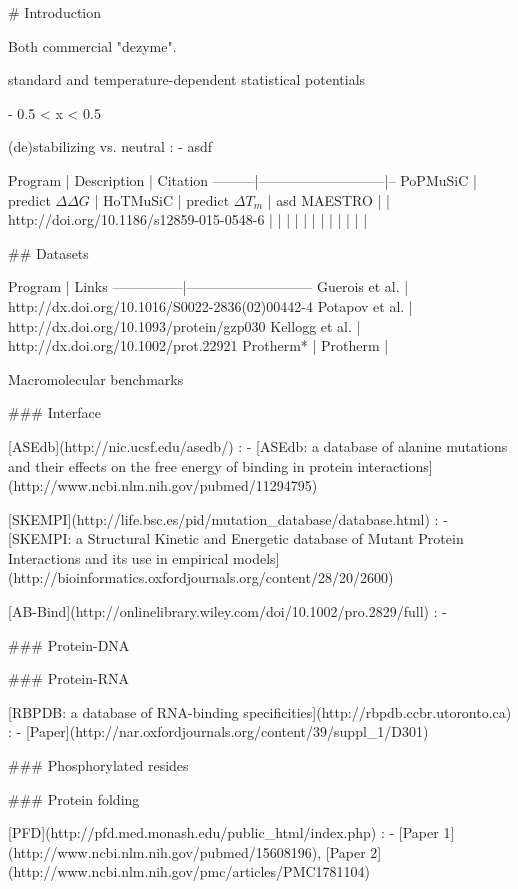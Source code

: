 
# Introduction


Both commercial "dezyme".

standard and temperature-dependent statistical potentials

- 0.5 < x < 0.5


(de)stabilizing vs. neutral
: - asdf



Program  | Description               |  Citation
---------|---------------------------|--
PoPMuSiC | predict $\Delta \Delta G$ |
HoTMuSiC | predict $\Delta T_{m}$    | asd
MAESTRO  |   | http://doi.org/10.1186/s12859-015-0548-6
  |   |
  |   |
  |   |
  |   |
  |   |
  |   |



## Datasets

Program        | Links
---------------|---------------------------
Guerois et al. | http://dx.doi.org/10.1016/S0022-2836(02)00442-4
Potapov et al. | http://dx.doi.org/10.1093/protein/gzp030
Kellogg et al. | http://dx.doi.org/10.1002/prot.22921
Protherm*      |
Protherm       |

Macromolecular benchmarks


### Interface

[ASEdb](http://nic.ucsf.edu/asedb/)
: - [ASEdb: a database of alanine mutations and their effects on the free energy of binding in protein interactions](http://www.ncbi.nlm.nih.gov/pubmed/11294795)

[SKEMPI](http://life.bsc.es/pid/mutation_database/database.html)
: - [SKEMPI: a Structural Kinetic and Energetic database of Mutant Protein Interactions and its use in empirical models](http://bioinformatics.oxfordjournals.org/content/28/20/2600)

[AB-Bind](http://onlinelibrary.wiley.com/doi/10.1002/pro.2829/full)
: -



### Protein-DNA




### Protein-RNA

[RBPDB: a database of RNA-binding specificities](http://rbpdb.ccbr.utoronto.ca)
: - [Paper](http://nar.oxfordjournals.org/content/39/suppl_1/D301)


### Phosphorylated resides




### Protein folding

[PFD](http://pfd.med.monash.edu/public_html/index.php)
: - [Paper 1](http://www.ncbi.nlm.nih.gov/pubmed/15608196), [Paper 2](http://www.ncbi.nlm.nih.gov/pmc/articles/PMC1781104)


